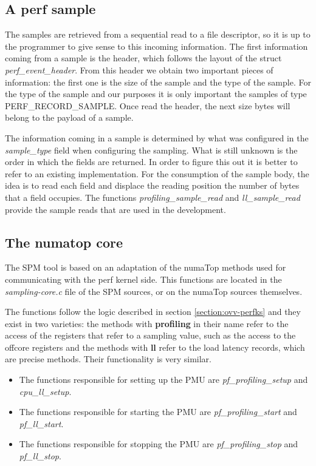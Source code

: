 \subsection{A perf sample}\label{section:pf-samplu}
     
The samples are retrieved from a sequential read to a file descriptor, so it is up to the programmer to give sense to this incoming information. The first information coming from a sample is the header, which follows the layout of the struct \textit{perf\_event\_header}. From this header we obtain two important pieces of information: the first one is the size of the sample and the type of the sample. For the type of the sample and our purposes it is only important the samples of type PERF\_RECORD\_SAMPLE. Once read the header, the next size bytes will belong to the payload of a sample.

The information coming in a sample is determined by what was configured in the \textit{sample\_type} field when configuring the sampling. What is still unknown is the order in which the fields are returned. In order to figure this out it is better to refer to an existing implementation. For the consumption of the sample body, the idea is to read each field and displace the reading position the number of bytes that a field occupies. The functions \textit{profiling\_sample\_read} and \textit{ll\_sample\_read} provide the sample reads that are used in the development. 

\subsection{The numatop core}\label{section:numatop-core}
The SPM tool is based on an adaptation of the numaTop methods used for communicating with the perf kernel side. This functions are located in the \textit{sampling-core.c} file of the SPM sources, or on the numaTop sources themselves.

The functions follow the logic described in section \ref{section:ovv-perfks} and they exist in two varieties: the methods with \textbf{profiling} in their name refer to the access of the registers that refer to a sampling value, such as the access to the offcore registers and the methods with \textbf{ll} refer to the load latency records, which are precise methods. Their functionality is very similar. 
\begin{itemize}
	\item The functions responsible for setting up the PMU are \textit{pf\_profiling\_setup} and \textit{cpu\_ll\_setup}.
	\item The functions responsible for starting the PMU are \textit{pf\_profiling\_start} and \textit{pf\_ll\_start}. 
	\item The functions responsible for stopping the PMU are \textit{pf\_profiling\_stop} and \textit{pf\_ll\_stop}.
\end{itemize}
  
